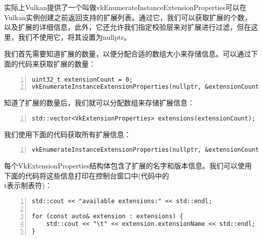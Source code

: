 \documentclass{ctexart}
\begin{document}
实际上Vulkan提供了一个叫做vkEnumerateInstanceExtensionProperties可以在Vulkan实例创建之前返回支持的扩展列表。通过它，我们可以获取扩展的个数，以及扩展的详细信息，此外，它还允许我们指定校验层来对扩展进行过滤，但在这里，我们不使用它，将其设置为nullptr。

我们首先需要知道扩展的数量，以便分配合适的数组大小来存储信息。可以通过下面的代码来获取扩展的数量：

\begin{lstlisting}[language={[ANSI]C},keywordstyle=\color{blue!70},commentstyle=\color{red!50!green!50!blue!50},frame=shadowbox, rulesepcolor=\color{red!20!green!20!blue!20},basicstyle=\small,numbers=left, numberstyle=\tiny,breaklines=true]
uint32_t extensionCount = 0;
vkEnumerateInstanceExtensionProperties(nullptr, &extensionCount, nullptr);
\end{lstlisting}

知道了扩展的数量后，我们就可以分配数组来存储扩展信息：

\begin{lstlisting}[language={[ANSI]C},keywordstyle=\color{blue!70},commentstyle=\color{red!50!green!50!blue!50},frame=shadowbox, rulesepcolor=\color{red!20!green!20!blue!20},basicstyle=\small,numbers=left, numberstyle=\tiny,breaklines=true]
std::vector<VkExtensionProperties> extensions(extensionCount);
\end{lstlisting}

我们使用下面的代码获取所有扩展信息：

\begin{lstlisting}[language={[ANSI]C},keywordstyle=\color{blue!70},commentstyle=\color{red!50!green!50!blue!50},frame=shadowbox, rulesepcolor=\color{red!20!green!20!blue!20},basicstyle=\small,numbers=left, numberstyle=\tiny,breaklines=true]
vkEnumerateInstanceExtensionProperties(nullptr, &extensionCount, extensions.data());
\end{lstlisting}

每个VkExtensionProperties结构体包含了扩展的名字和版本信息。我们可以使用下面的代码将这些信息打印在控制台窗口中(代码中的\\t表示制表符)：

\begin{lstlisting}[language={[ANSI]C},keywordstyle=\color{blue!70},commentstyle=\color{red!50!green!50!blue!50},frame=shadowbox, rulesepcolor=\color{red!20!green!20!blue!20},basicstyle=\small,numbers=left, numberstyle=\tiny,breaklines=true]
std::cout << "available extensions:" << std::endl;

for (const auto& extension : extensions) {
	std::cout << "\t" << extension.extensionName << std::endl;
}
\end{lstlisting}
\end{document}

